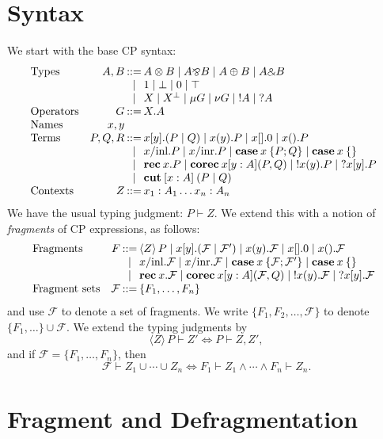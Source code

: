\documentclass{article}
\makeatletter
\newcommand{\cut}[4]{\mathbf{cut}\: [#1:#2] \: (#3 \mid #4)}
\newcommand{\unroll}[2]{\mathbf{rec}\:#1.#2}
\newcommand{\roll}[5]{\mathbf{corec}\:#1 [#2:#3] (#4,#5)}
\newcommand{\case}[2]{\mathbf{case}\:#1\:\{#2\}}
\newcommand{\sel}[3]{#1/\mathrm{#2}.#3}
\newcommand{\fragment}[2]{\langle #1 \rangle \, #2}
\def\tensor{\otimes}
\def\parr{\bindnasrepma}
\def\with{\binampersand}
\def\F{\mathcal{F}}
\newenvironment{syntax}%
{\[\begin{array}{@{}lr@{\hspace{2px}}c@{\hspace{2px}}l}\ignorespaces}
{\end{array}\]\ignorespacesafterend}
\makeatother
\begin{document}
\section{Syntax}

We start with the base CP syntax:
\begin{syntax}
  \text{Types} & A, B & ::= & A \tensor B \mid A \parr B \mid A \oplus B \mid A \with B \\
  & & \mid & 1 \mid \bot \mid 0 \mid \top \\
  & & \mid & X \mid X^\perp \mid \mu G \mid \nu G \mid {!A} \mid {?A} \\
  \text{Operators} & G & ::= & X.A \\
  \text{Names} & x,y \\
  \text{Terms} & P,Q,R & ::= & x[y].(P \mid Q) \mid x(y).P \mid x[].0 \mid x().P \\
  & & \mid & \sel{x}{inl}{P} \mid \sel{x}{inr}{P} \mid \case{x}{P;Q} \mid \case{x}{} \\
  & & \mid & \unroll{x}{P} \mid \roll{x}{y}{A}{P}{Q} \mid {!x(y).P} \mid {?x[y].P} \\
  & & \mid & \cut{x}{A}{P}{Q} \\
  \text{Contexts} & Z & ::= & x_1:A_1 \dots x_n:A_n
\end{syntax}
We have the usual typing judgment: $P \vdash Z$.  We extend this with a notion of
\textit{fragments} of CP expressions, as follows:
\begin{syntax}
 \text{Fragments} & F & ::= & \fragment{Z}{P} \mid x[y].(\F \mid \F') \mid x(y).\F \mid x[].0 \mid x().\F \\
 & & \mid & \sel{x}{inl}{\F} \mid \sel{x}{inr}{\F} \mid \case{x}{\F;\F'} \mid \case{x}{} \\
 & & \mid & \unroll{x}{\F} \mid \roll{x}{y}{A}{\F}{Q} \mid {!x(y).\F} \mid {?x[y].\F} \\
 \text{Fragment sets} & \F & ::= & \{ F_1, \dots, F_n \}
\end{syntax}
and use $\F$ to denote a set of fragments.  We write $\{F_1,F_2,\dots,\F\}$ to denote
$\{F_1,\dots\}\cup\F$.  We extend the typing judgments by
\[
  \fragment{Z}{P} \vdash Z' \iff P \vdash Z,Z',
\]
and if $\F = \{F_1,\dots,F_n\}$, then
\[
  \F \vdash Z_1 \cup \cdots \cup Z_n \iff F_1 \vdash Z_1 \land \cdots \land F_n \vdash Z_n.
\]

\section{Fragment and Defragmentation}
\end{document}
